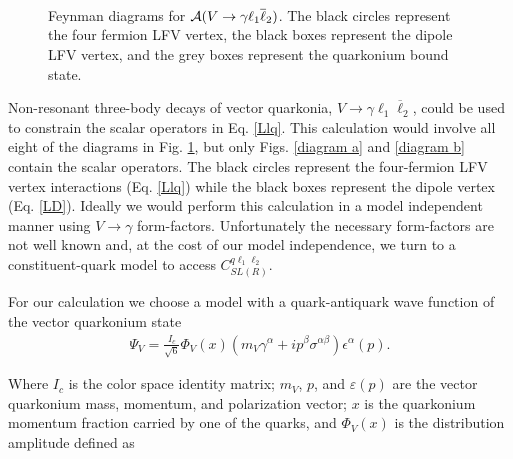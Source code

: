 \documentclass[12pt]{article}
\begin{document}
\begin{figure}
\center
{}
 \\
 \\
 \\
\caption{ Feynman diagrams for ${\cal A} (V \to \gamma \ell_1 \overline \ell_2)$. 
The black circles represent the four fermion LFV vertex, the black boxes represent the 
dipole LFV vertex, and the grey boxes represent the quarkonium bound state.}
\label{fig:vector3body}
\end{figure}

Non-resonant three-body decays of vector quarkonia, $V \to \gamma \ell_1 \overline{\ell}_2$, 
could be used to constrain the scalar operators in Eq. \ref{Llq}.  This calculation would involve 
all eight of the diagrams in Fig. \ref{fig:vector3body}, but only Figs. \ref{diagram a} and \ref{diagram b} 
contain the scalar operators.  The black circles represent the four-fermion LFV vertex 
interactions (Eq. \ref{Llq}) while the black boxes represent the dipole vertex (Eq. \ref{LD}). 
Ideally we would perform this calculation in a model independent manner using $V \to \gamma$ 
form-factors.  Unfortunately the necessary form-factors are not well known and, at the cost of 
our model independence, we turn to a constituent-quark model to access $C_{SL(R)}^{q \ell_1 \ell_2}$.

For our calculation we choose a model with a quark-antiquark wave function of the vector quarkonium state \cite{Aditya:2012ay, Dziembowski:1986dr, Szczepaniak:1990dt, Lepage:1980fj}
%
\begin{eqnarray}
\Psi_V = \frac{I_c}{\sqrt{6}} \Phi_V(x) \left(m_V \gamma^{\alpha}+ i p^{\beta} \sigma^{\alpha \beta} \right) \epsilon^{\alpha}(p).
\label{wavefunction}
\end{eqnarray} 

Where $I_c$ is the color space identity matrix; $m_V$, $p$, and $\varepsilon(p)$ are the vector quarkonium mass, momentum, and polarization vector; $x$ is the quarkonium momentum fraction carried by one of the quarks, and $\Phi_V(x)$ is the distribution amplitude defined as
\end{document}

